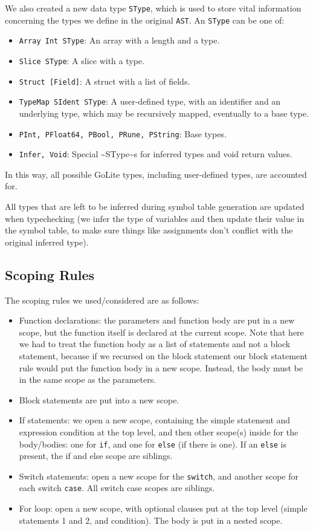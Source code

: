 \documentclass[11pt]{article}
\begin{document}
We also created a new data type \texttt{SType}, which is used to store
vital information concerning the types we define in the original
\texttt{AST}.  An \texttt{SType} can be one of:
\begin{itemize}
\item \texttt{Array Int SType}: An array with a length and a type.
\item \texttt{Slice SType}: A slice with a type.
\item \texttt{Struct [Field]}: A struct with a list of fields.
\item \texttt{TypeMap SIdent SType}: A user-defined type, with an identifier and an
underlying type, which may be recursively mapped, eventually to a
base type.
\item \texttt{PInt, PFloat64, PBool, PRune, PString}: Base types.
\item \texttt{Infer, Void}: Special \textasciitilde{}SType\textasciitilde{}s for inferred types and void return values.
\end{itemize}
In this way, all possible GoLite types, including user-defined
types, are accounted for.

All types that are left to be inferred during symbol table
generation are updated when typechecking (we infer the type of
variables and then update their value in the symbol table, to make
sure things like assignments don't conflict with the original
inferred type).
\subsection{Scoping Rules}
\label{sec:org6db7fbb}
The scoping rules we used/considered are as follows:
\begin{itemize}
\item Function declarations: the parameters and function body are put
in a new scope, but the function itself is declared at the
current scope. Note that here we had to treat the function body
as a list of statements and not a block statement, because if we
recursed on the block statement our block statement rule would
put the function body in a new scope. Instead, the body must be
in the same scope as the parameters.
\item Block statements are put into a new scope.
\item If statements: we open a new scope, containing the simple
statement and expression condition at the top level, and then
other scope(s) inside for the body/bodies: one for \texttt{if}, and one
for \texttt{else} (if there is one). If an \texttt{else} is present, the if and
else scope are siblings.
\item Switch statements: open a new scope for the \texttt{switch}, and another scope
for each switch \texttt{case}. All switch case scopes are siblings.
\item For loop: open a new scope, with optional clauses put at the top
level (simple statements 1 and 2, and condition). The body is put
in a nested scope.
\end{itemize}
\end{document}

